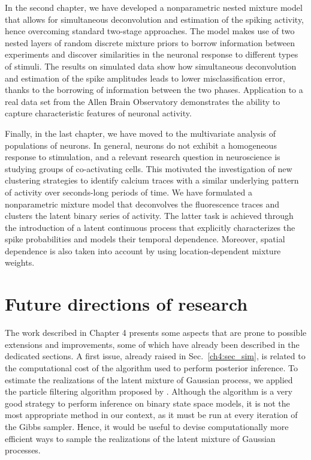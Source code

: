 In the second chapter, we have developed a nonparametric nested mixture model that allows for simultaneous deconvolution and estimation of the spiking activity, hence overcoming standard two-stage approaches.
The model makes use of two nested layers of random discrete mixture priors to borrow information between experiments and discover similarities in the neuronal response to different types of stimuli. 
The results on simulated data show how simultaneous deconvolution and estimation of the spike amplitudes leads to lower misclassification error, thanks to the borrowing of information between the two phases. Application to a real data set from the Allen Brain Observatory demonstrates the ability to capture characteristic features of neuronal activity.

Finally, in the last chapter, we have moved to the multivariate analysis of populations of neurons. In general, neurons do not exhibit a homogeneous response to stimulation, and a relevant research question in neuroscience is studying groups of co-activating cells.
This motivated the investigation of new clustering strategies to identify calcium traces with a similar underlying pattern of activity over seconds-long periods of time.
We have formulated a nonparametric mixture model that deconvolves the fluorescence traces and clusters the latent binary series of activity. The latter task is achieved through the introduction of a latent continuous process that explicitly characterizes the spike probabilities and models their temporal dependence. Moreover, spatial dependence is also taken into account by using location-dependent mixture weights.

\section*{Future directions of research}

The work described in Chapter 4 presents some aspects that are prone to possible extensions and improvements, some of which have already been described in the dedicated sections. A first issue, already raised in Sec.~\ref{ch4:sec_sim}, is related to the computational cost of the algorithm used to perform posterior inference. To estimate the realizations of the latent mixture of Gaussian process, we applied the particle filtering algorithm proposed by \textcite{fasano2021}. Although the algorithm is a very good strategy to perform inference on binary state space models, it is not the most appropriate method in our context, as it must be run at every iteration of the Gibbs sampler. Hence, it would be useful to devise computationally more efficient ways to sample the realizations of the latent mixture of Gaussian processes.

